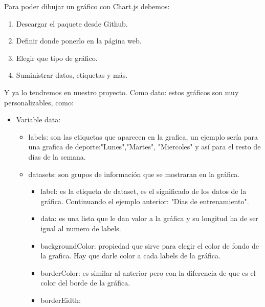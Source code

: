 \documentclass[a4paper, 11pt]{article}
\begin{document}
\begin{itemize}
          Para poder dibujar un gráfico con Chart.js debemos:
          \begin{enumerate}[1.]
            \item Descargar el paquete desde Github.
            \item Definir donde ponerlo en la página web.
            \item Elegir que tipo de gráfico.
            \item Suministrar datos, etiquetas y más.
          \end{enumerate}
          Y ya lo tendremos en nuestro proyecto. Como dato: estos gráficos son muy
          personalizables, como:

          \begin{itemize}
            \item{Variable data:}
              \begin{itemize}
                  \item{labels: son las etiquetas que aparecen en la grafica, un
                        ejemplo sería para una grafica de deporte:"Lunes","Martes",
                        "Miercoles" y así para el resto de días de la semana.}
                  \item{datasets: son grupos de información que se mostraran en
                        la gráfica.}
                        \begin{itemize}
                          \item{label: es la etiqueta de dataset, es el significado
                                de los datos de la gráfica. Continuando el ejemplo
                                anterior: "Días de entrenamiento".}
                          \item{data: es una lista que le dan valor a la gráfica
                                y su longitud ha de ser igual al numero de labels. }
                          \item{backgroundColor: propiedad que sirve para elegir
                                el color de fondo de la grafica. Hay que darle
                                color a cada labels de la gráfica.}
                          \item{borderColor: es similar al anterior pero con la
                                diferencia de que es el color del borde de la gráfica.}
                          \item{borderEidth: }
                        \end{itemize}
                \end{itemize}
          \end{itemize}


\end{itemize}
\end{document}
